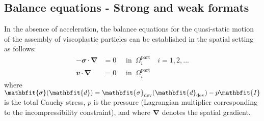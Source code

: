\documentclass[12pt,a4paper,fleqn]{article}
\renewcommand{\ta}[1]{\mathbfit{#1}}
\renewcommand{\ts}[1]{\mathbfit{#1}}
\renewcommand{\diff}{\mathbfup{\nabla}}
\newcommand{\pore}{\mathrm{pore}}
\newcommand{\particle}{\mathrm{part}}
\newcommand{\contact}{\mathrm{cont}}
\newcommand{\surf}{\mathrm{s}}
\begin{document}
%
%

\subsection{Balance equations - Strong and weak formats}

In the absence of acceleration, the balance equations for the quasi-static motion of the assembly of viscoplastic particles can be established in the spatial setting as follows:
\begin{subequations}\label{eq:strong_form}
\begin{align}
    -\ts{\sigma}\cdot\diff & = \ts{0} \quad \mbox{ in }\,\Omega^\particle_i\quad i = 1,2,...
\label{eq:strong_form_v}
\\
    \ta{v}\cdot\diff & = 0 \quad \mbox{ in }\,\Omega^\particle_i
\label{eq:strong_form_p}
\end{align}
\end{subequations}
where $\ts{\sigma}(\ts{d})=\ts{\sigma}_\dev(\ts{d}_\dev)-p\ts{I}$ is the total Cauchy stress, $p$ is the pressure (Lagrangian multiplier corresponding to the incompressibility constraint), and
where $\diff$ denotes the spatial gradient.

\end{document}
